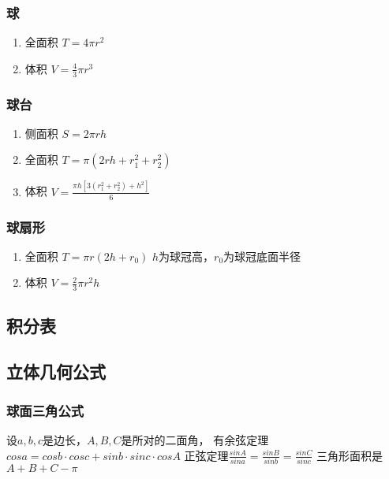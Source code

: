 \documentclass[landscape,twocolumn,a4paper]{article}
\begin{document}
\subsubsection{球}

\begin{enumerate}
	\item 全面积
	$T=4\pi r^2$
	\item 体积
	$V=\frac{4}{3}\pi r^3$
\end{enumerate}
\fi
\subsubsection{球台}

\begin{enumerate}
	\item 侧面积
	$S=2\pi rh$
	\item 全面积
	$T=\pi(2rh+r_1^2+r_2^2)$
	\item 体积
	$V=\frac{\pi h[3(r_1^2+r_2^2)+h^2]}{6}$
\end{enumerate}

\subsubsection{球扇形}

\begin{enumerate}
	\item 全面积
	$T=\pi r(2h+r_0)$
	$h$为球冠高，$r_0$为球冠底面半径
	\item 体积
	$V=\frac{2}{3}\pi r^2h$
\end{enumerate}

\subsection{积分表}

\iffalse
\subsection{立体几何公式}

\subsubsection{球面三角公式}

设$a, b, c$是边长，$A, B, C$是所对的二面角，
有余弦定理$cos a = cos b \cdot cos c + sin b \cdot sin c \cdot cos A$
正弦定理$\frac{sin A}{sin a} = \frac{sin B}{sin b} = \frac{sin C}{sin c}$
三角形面积是$A + B + C - \pi$
\end{document}
